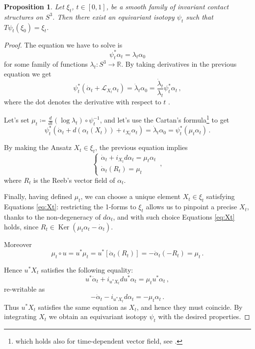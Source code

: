 \documentclass[a4paper, 11pt]{amsart}
\theoremstyle{plain}
\newtheorem{prop}{Proposition}[section]
\theoremstyle{definition}
\newcommand{\R}{\mathbb{R}}
\newcommand{\Lie}{\mathcal{L}}
\DeclareMathOperator{\Ker}{Ker}
\begin{document}
\begin{prop}\label{EGray}
	Let $\xi_t$, $t \in [0,1]$, be a smooth family of invariant contact structures on $S^3$. Then there exist an equivariant isotopy $\psi_t$ such that $T\psi_t(\xi_0) = \xi_t$. 
\end{prop}
\begin{proof}
	The equation we have to solve is
	\[
		\psi_t^*\alpha_t = \lambda_t\alpha_0
	\]
	for some family of functions $\lambda_t \colon S^3 \to \R$. By taking derivatives in the previous equation we get
	\[
		\psi^*_t (\dot{\alpha}_t + \Lie_{X_t}\alpha_t) = \dot{\lambda}_t\alpha_0 = \frac{\dot{\lambda}_t}{\lambda_t}\psi_t^*\alpha_t\,,
	\]
	where the dot denotes the derivative with respect to $t$ \cite[Lemma 2.2.1]{geigesIntroductionContactTopology2008}.
	
	Let's set $\mu_t \coloneqq \tfrac{d}{dt}(\log \lambda_t )\circ \psi_t^{-1}$, and let's use the Cartan's formula\footnote{which holds also for time-dependent vector field, see \cite[App.\ B]{geigesIntroductionContactTopology2008}.} to get
	\[
		\psi^*_t (\dot{\alpha}_t + d(\alpha_t(X_t)) +\iota_{X_t}\alpha_t) = \dot{\lambda}_t\alpha_0 = \psi_t^*(\mu_t\alpha_t)\,.
	\]
	
	By making the Ansatz $X_t \in \xi_t$, the previous equation implies
	\begin{equation}\label{eq:Xt}
	\begin{cases}
		\dot{\alpha}_t + i_{X_t}d\alpha_t = \mu_t\alpha_t \\
		\dot{\alpha}_t(R_t) = \mu_t
	\end{cases}\,,
	\end{equation}
	where $R_t$ is the Reeb's vector field of $\alpha_t$.
	
	Finally, having defined $\mu_t$, we can choose a unique element $X_t \in \xi_t$ satisfying Equations \eqref{eq:Xt}: restricting the 1-forms to $\xi_t$ allows us to pinpoint a precise $X_t$, thanks to the non-degeneracy of $d\alpha_t$, and with such choice Equations \eqref{eq:Xt} holds, since $R_t \in \Ker(\mu_t\alpha_t - \dot{\alpha}_t)$.
	
	Moreover
	\[
		\mu_t \circ u = u^*\mu_t = u^*[\dot{\alpha}_t(R_t)] = - \dot{\alpha}_t(- R_t) = \mu_t\,.
	\] 
	
	Hence $u^*X_t$ satisfies the following equality:
	\[
		u^*\dot{\alpha}_t + i_{u^*X_t}du^*\alpha_t = \mu_t u^*\alpha_t\,,
	\]
	re-writable as
	\[
		-\dot{\alpha}_t - i_{u^*X_t} d\alpha_t = -\mu_t\alpha_t\,.
	\]
	Thus $u^*X_t$ satisfies the same equation as $X_t$, and hence they must coincide. By integrating $X_t$ we obtain an equivariant isotopy $\psi_t$ with the desired properties.
\end{proof}
\end{document}
